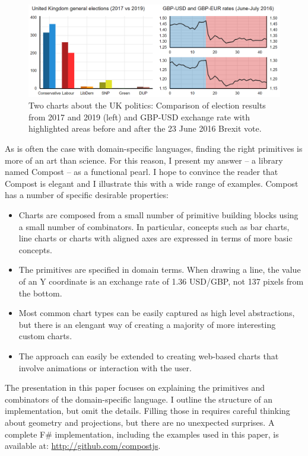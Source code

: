 \documentclass{jfp}
\newcommand{\urrl}[1]{\textnormal{\textcolor{urlclr}{\url{#1}}}}
\begin{document}
\begin{figure}[h]
  \includegraphics[scale=0.57]{figures/charts}
  \vspace{0.25em}
  \caption{Two charts about the UK politics: Comparison of election results from 2017 and 2019 (left)
    and GBP-USD exchange rate with highlighted areas before and after the 23 June 2016 Brexit vote.}
  \label{fig:charts}
\end{figure}

As is often the case with domain-specific languages, finding the right primitives is more of an art
than science. For this reason, I present my answer -- a library named Compost -- as a functional pearl.
I hope to convince the reader that Compost is elegant and I illustrate this with a wide range
of examples. Compost has a number of specific desirable properties:

\begin{itemize}
\item Charts are composed from a small number of primitive building blocks using a small number of
  combinators. In particular, concepts such as bar charts, line charts or charts with aligned
  axes are expressed in terms of more basic concepts.
\item The primitives are specified in domain terms. When drawing a line, the value of an Y coordinate
  is an exchange rate of 1.36 USD/GBP, not 137 pixels from the bottom.
\item Most common chart types can be easily captured as high level abstractions, but there is an
  elengant way of creating a majority of more interesting custom charts.
\item The approach can easily be extended to creating web-based charts that involve animations
  or interaction with the user.
\end{itemize}
%
The presentation in this paper focuses on explaining the primitives and combinators of the
domain-specific language. I outline the structure of an implementation, but omit the details. Filling
those in requires careful thinking about geometry and projections, but there are no unexpected
surprises. A complete F\# implementation, including the examples used in this paper, is available
at: \urrl{http://github.com/compostjs}.
\end{document}
